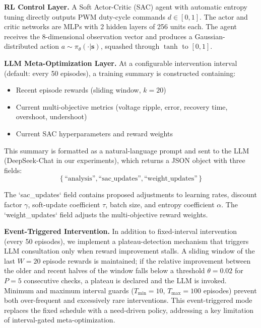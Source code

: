 \documentclass[11pt,a4paper]{article}
\begin{document}
\textbf{RL Control Layer.}
A Soft Actor-Critic (SAC) agent \cite{haarnoja2018sac} with automatic entropy
tuning directly outputs PWM duty-cycle commands $d \in [0, 1]$.
The actor and critic networks are MLPs with 2 hidden layers of 256 units each.
The agent receives the 8-dimensional observation vector and produces a
Gaussian-distributed action $a \sim \pi_\theta(\cdot|\mathbf{s})$, squashed
through $\tanh$ to $[0, 1]$.

\textbf{LLM Meta-Optimization Layer.}
At a configurable intervention interval (default: every 50 episodes), a training
summary is constructed containing:
\begin{itemize}
    \item Recent episode rewards (sliding window, $k=20$)
    \item Current multi-objective metrics (voltage ripple, error, recovery time,
    overshoot, undershoot)
    \item Current SAC hyperparameters and reward weights
\end{itemize}

This summary is formatted as a natural-language prompt and sent to the LLM
(DeepSeek-Chat in our experiments), which returns a JSON object with three
fields:
\begin{equation}
    \{\,\text{``analysis''}, \text{``sac\_updates''}, \text{``weight\_updates''}\,\}
\end{equation}

The `sac\_updates` field contains proposed adjustments to learning rates,
discount factor $\gamma$, soft-update coefficient $\tau$, batch size, and
entropy coefficient $\alpha$. The `weight\_updates` field adjusts the
multi-objective reward weights.

\textbf{Event-Triggered Intervention.}
In addition to fixed-interval intervention (every 50 episodes), we implement
a plateau-detection mechanism that triggers LLM consultation only when reward
improvement stalls.
A sliding window of the last $W = 20$ episode rewards is maintained; if the
relative improvement between the older and recent halves of the window falls
below a threshold $\theta = 0.02$ for $P = 5$ consecutive checks, a plateau
is declared and the LLM is invoked.
Minimum and maximum interval guards ($T_{\min} = 10$, $T_{\max} = 100$ episodes)
prevent both over-frequent and excessively rare interventions.
This event-triggered mode replaces the fixed schedule with a need-driven policy,
addressing a key limitation of interval-gated meta-optimization.
\end{document}
